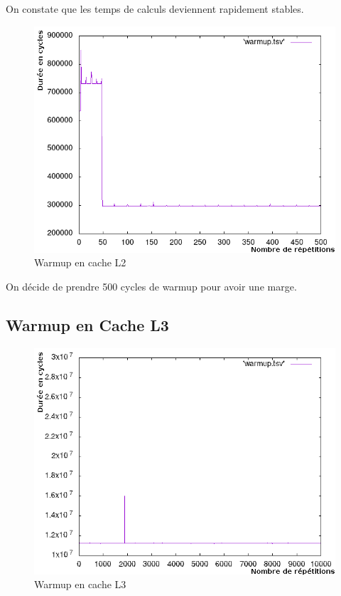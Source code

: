 \documentclass[a4paper]{report}
\begin{document}
On constate que les temps de calculs deviennent rapidement stables.

\newpage
    \begin{figure}[ht!]
        \centering
        \includegraphics[width=120mm]{MEDIA/closeup.png}
        \caption{Warmup en cache L2}
    \end{figure}

    On décide de prendre 500 cycles de warmup pour avoir une marge.

\newpage
\subsection*{Warmup en Cache L3}
    \begin{figure}[ht!]
        \centering
        \includegraphics[width=120mm]{MEDIA/warmupL3_NOCstate.png}
        \caption{Warmup en cache L3}
    \end{figure}
\end{document}
